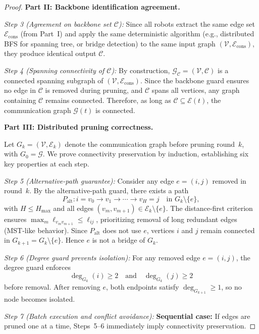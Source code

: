 \documentclass[conference]{IEEEconf}
\theoremstyle{plain}
\begin{document}
\begin{proof}
\medskip
\noindent\textbf{Part II: Backbone identification agreement.}

\emph{Step 3 (Agreement on backbone set $\mathcal{C}$):}
Since all robots extract the same edge set $\mathcal{E}_{\mathrm{cons}}$ (from Part~I) and apply the same deterministic algorithm (e.g., distributed BFS for spanning tree, or bridge detection) to the same input graph $(\mathcal{V},\mathcal{E}_{\mathrm{cons}})$, they produce identical output $\mathcal{C}$.

\emph{Step 4 (Spanning connectivity of $\mathcal{C}$):}
By construction, $\mathcal{G}_{\mathcal{C}}=(\mathcal{V},\mathcal{C})$ is a connected spanning subgraph of $(\mathcal{V},\mathcal{E}_{\mathrm{cons}})$.
Since the backbone guard ensures no edge in $\mathcal{C}$ is removed during pruning, and $\mathcal{C}$ spans all vertices, any graph containing $\mathcal{C}$ remains connected.
Therefore, as long as $\mathcal{C}\subseteq\mathcal{E}(t)$, the communication graph $\mathcal{G}(t)$ is connected.

\medskip
\noindent\textbf{Part III: Distributed pruning correctness.}

Let $G_k=(\mathcal{V},\mathcal{E}_k)$ denote the communication graph before pruning round~$k$, with $G_0=\mathcal{G}$.
We prove connectivity preservation by induction, establishing six key properties at each step.

\emph{Step 5 (Alternative-path guarantee):}
Consider any edge $e=(i,j)$ removed in round~$k$.
By the alternative-path guard, there exists a path
\[
P_{\mathrm{alt}}: i=v_0\to v_1\to\cdots\to v_H=j \quad\text{in }G_k\setminus\{e\},
\]
with $H\le H_{\max}$ and all edges $(v_m,v_{m+1})\in\mathcal{E}_k\setminus\{e\}$.
The distance-first criterion ensures $\max_m\ell_{v_m v_{m+1}}\le\ell_{ij}$, prioritizing removal of long redundant edges (MST-like behavior).
Since $P_{\mathrm{alt}}$ does not use $e$, vertices $i$ and $j$ remain connected in $G_{k+1}=G_k\setminus\{e\}$.
Hence $e$ is not a bridge of $G_k$.

\emph{Step 6 (Degree guard prevents isolation):}
For any removed edge $e=(i,j)$, the degree guard enforces
\[
\deg_{G_k}(i)\ge 2 \quad\text{and}\quad \deg_{G_k}(j)\ge 2
\]
before removal. After removing $e$, both endpoints satisfy $\deg_{G_{k+1}}\ge 1$, so no node becomes isolated.

\emph{Step 7 (Batch execution and conflict avoidance):}
\textbf{Sequential case:} If edges are pruned one at a time, Steps~5--6 immediately imply connectivity preservation.


\end{proof}
\end{document}
